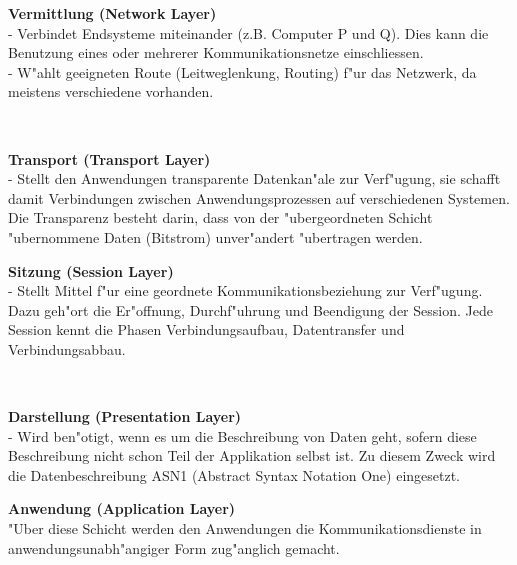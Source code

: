  
 \begin{minipage}[t]{9cm}
 	\textbf{Vermittlung (Network Layer)}\\
	- Verbindet Endsysteme miteinander (z.B. Computer P und Q). Dies kann die Benutzung eines oder mehrerer Kommunikationsnetze einschliessen.\\
	- W"ahlt geeigneten Route (Leitweglenkung, Routing) f"ur das Netzwerk, da meistens verschiedene vorhanden.
\end{minipage}
 \begin{minipage}[t]{0.5cm}
 	\-\
 \end{minipage}
 \begin{minipage}[t]{9cm}
 	\textbf{Transport (Transport Layer)}\\
- Stellt den Anwendungen transparente Datenkan"ale zur Verf"ugung, sie schafft damit Verbindungen zwischen Anwendungsprozessen auf verschiedenen Systemen. Die Transparenz besteht darin, dass von der "ubergeordneten Schicht "ubernommene Daten (Bitstrom) unver"andert "ubertragen werden.
 \end{minipage}

\begin{minipage}[t]{9cm}
 	\textbf{Sitzung (Session Layer)}\\
	- Stellt Mittel f"ur eine geordnete Kommunikationsbeziehung zur Verf"ugung. Dazu geh"ort die Er"offnung, Durchf"uhrung und Beendigung der Session. Jede Session kennt die Phasen Verbindungsaufbau, Datentransfer und Verbindungsabbau.
 \end{minipage}
 \begin{minipage}[t]{0.5cm}
 	\-\
 \end{minipage}
 \begin{minipage}[t]{9cm}
 	\textbf{Darstellung (Presentation Layer)}\\
	- Wird ben"otigt, wenn es um die Beschreibung von Daten geht, sofern diese Beschreibung nicht schon Teil der Applikation selbst ist. Zu diesem Zweck wird die Datenbeschreibung ASN1 (Abstract Syntax Notation One) eingesetzt.
 \end{minipage}
 
 
 \textbf{Anwendung (Application Layer)}\\
"Uber diese Schicht werden den Anwendungen die Kommunikationsdienste in anwendungsunabh"angiger Form zug"anglich gemacht.

